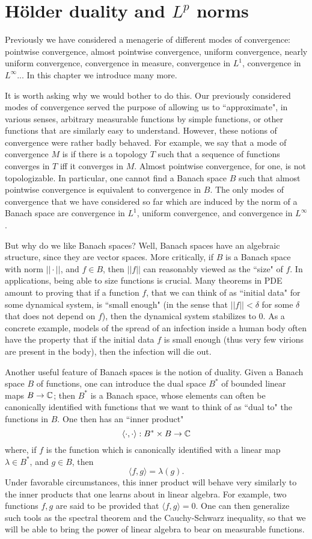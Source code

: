 \chapter{H\"older duality and $L^p$ norms}
Previously we have considered a menagerie of different modes of convergence: pointwise convergence, almost pointwise convergence, uniform convergence, nearly uniform convergence, convergence in measure, convergence in $L^1$, convergence in $L^\infty$...
In this chapter we introduce many more.

It is worth asking why we would bother to do this.
Our previously considered modes of convergence served the purpose of allowing us to ``approximate", in various senses, arbitrary measurable functions by simple functions, or other functions that are similarly easy to understand.
However, these notions of convergence were rather badly behaved.
For example, we say that a mode of convergence $M$ is  if there is a topology $T$ such that a sequence of functions converges in $T$ iff it converges in $M$.
Almost pointwise convergence, for one, is not topologizable.
In particular, one cannot find a Banach space $B$ such that almost pointwise convergence is equivalent to convergence in $B$.
The only modes of convergence that we have considered so far which are induced by the norm of a Banach space are convergence in $L^1$, uniform convergence, and convergence in $L^\infty$.

But why do we like Banach spaces? Well, Banach spaces have an algebraic structure, since they are vector spaces.
More critically, if $B$ is a Banach space with norm $||\cdot||$, and $f \in B$, then $||f||$ can reasonably viewed as the ``size" of $f$.
In applications, being able to size functions is crucial.
Many theorems in PDE amount to proving that if a function $f$, that we can think of as ``initial data" for some dynamical system, is ``small enough" (in the sense that $||f|| < \delta$ for some $\delta$ that does not depend on $f$), then the dynamical system stabilizes to $0$.
As a concrete example, models of the spread of an infection inside a human body often have the property that if the initial data $f$ is small enough (thus very few virions are present in the body), then the infection will die out.

Another useful feature of Banach spaces is the notion of duality.
Given a Banach space $B$ of functions, one can introduce the dual space $B^*$ of bounded linear maps $B \to \mathbb{C}$; then $B^*$ is a Banach space, whose elements can often be canonically identified with functions that we want to think of as ``dual to" the functions in $B$.
One then has an ``inner product"
\[\langle \cdot, \cdot\rangle: B^* \times B \to \mathbb{C}\]
where, if $f$ is the function which is canonically identified with a linear map $\lambda \in B^*$, and $g \in B$, then
\[\langle f, g\rangle = \lambda(g).\]
Under favorable circumstances, this inner product will behave very similarly to the inner products that one learns about in linear algebra.
For example, two functions $f, g$ are said to be  provided that $\langle f, g\rangle = 0$.
One can then generalize such tools as the spectral theorem and the Cauchy-Schwarz inequality, so that we will be able to bring the power of linear algebra to bear on measurable functions.

